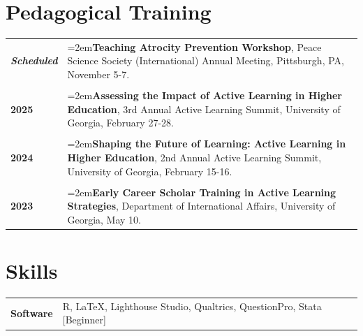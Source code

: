 \documentclass[letterpaper,12pt]{article}
\begin{document}
\section{Pedagogical Training}
\begin{xltabular}{\dimexpr\textwidth-0in}{p{1.5in}X}
\textbf{\textit{Scheduled}} 	& \hangindent=2em\textbf{Teaching Atrocity Prevention Workshop}, Peace Science Society \mbox{(International)} Annual Meeting, Pittsburgh, PA, November 5-7.\\ \\

\textbf{2025} 			&  \hangindent=2em\textbf{Assessing the Impact of Active Learning in Higher Education}, 3rd Annual Active Learning Summit, University of Georgia, February 27-28.\\ \\

\textbf{2024} 			&  \hangindent=2em\textbf{Shaping the Future of Learning: Active Learning in Higher Education}, 2nd Annual Active Learning Summit, University of Georgia, February 15-16.\\ \\

\textbf{2023} 			&  \hangindent=2em\textbf{Early Career Scholar Training in Active Learning Strategies}, Department of \mbox{International} Affairs, University of Georgia, May 10.
\end{xltabular}

\section{Skills}
\begin{xltabular}{\dimexpr\textwidth-0in}{p{1.5in}X}
\textbf{Software} 		&  R, \LaTeX, Lighthouse Studio, Qualtrics, QuestionPro, Stata [Beginner]\\
\end{xltabular}

\end{document}
